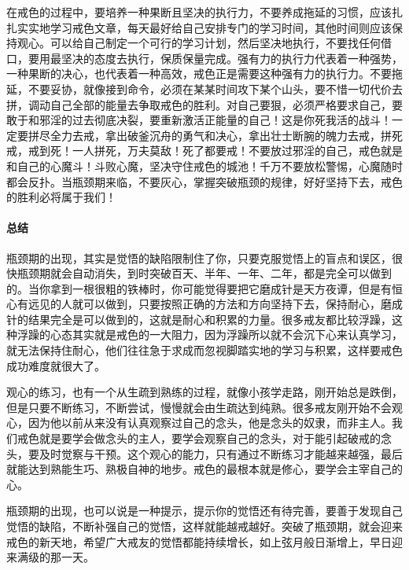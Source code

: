 在戒色的过程中，要培养一种果断且坚决的执行力，不要养成拖延的习惯，应该扎扎实实地学习戒色文章，每天最好给自己安排专门的学习时间，其他时间则应该保持观心。可以给自己制定一个可行的学习计划，然后坚决地执行，不要找任何借口，要用最坚决的态度去执行，保质保量完成。强有力的执行力代表着一种强势，一种果断的决心，也代表着一种高效，戒色正是需要这种强有力的执行力。不要拖延，不要妥协，就像接到命令，必须在某某时间攻下某个山头，要不惜一切代价去拼，调动自己全部的能量去争取戒色的胜利。对自己要狠，必须严格要求自己，要敢于和邪淫的过去彻底决裂，要重新激活正能量的自己！这是你死我活的战斗！一定要拼尽全力去戒，拿出破釜沉舟的勇气和决心，拿出壮士断腕的魄力去戒，拼死戒，戒到死！一人拼死，万夫莫敌！死了都要戒！不要放过邪淫的自己，戒色就是和自己的心魔斗！斗败心魔，坚决守住戒色的城池！千万不要放松警惕，心魔随时都会反扑。当瓶颈期来临，不要灰心，掌握突破瓶颈的规律，好好坚持下去，戒色的胜利必将属于我们！

\paragraph*{总结}

瓶颈期的出现，其实是觉悟的缺陷限制住了你，只要克服觉悟上的盲点和误区，很快瓶颈期就会自动消失，到时突破百天、半年、一年、二年，都是完全可以做到的。当你拿到一根很粗的铁棒时，你可能觉得要把它磨成针是天方夜谭，但是有恒心有远见的人就可以做到，只要按照正确的方法和方向坚持下去，保持耐心，磨成针的结果完全是可以做到的，这就是耐心和积累的力量。很多戒友都比较浮躁，这种浮躁的心态其实就是戒色的一大阻力，因为浮躁所以就不会沉下心来认真学习，就无法保持住耐心，他们往往急于求成而忽视脚踏实地的学习与积累，这样要戒色成功难度就很大了。

观心的练习，也有一个从生疏到熟练的过程，就像小孩学走路，刚开始总是跌倒，但是只要不断练习，不断尝试，慢慢就会由生疏达到纯熟。很多戒友刚开始不会观心，因为他以前从来没有认真观察过自己的念头，他是念头的奴隶，而非主人。我们戒色就是要学会做念头的主人，要学会观察自己的念头，对于能引起破戒的念头，要及时觉察与干预。这个观心的能力，只有通过不断练习才能越来越强，最后就能达到熟能生巧、熟极自神的地步。戒色的最根本就是修心，要学会主宰自己的心。

瓶颈期的出现，也可以说是一种提示，提示你的觉悟还有待完善，要善于发现自己觉悟的缺陷，不断补强自己的觉悟，这样就能越戒越好。突破了瓶颈期，就会迎来戒色的新天地，希望广大戒友的觉悟都能持续增长，如上弦月般日渐增上，早日迎来满级的那一天。
